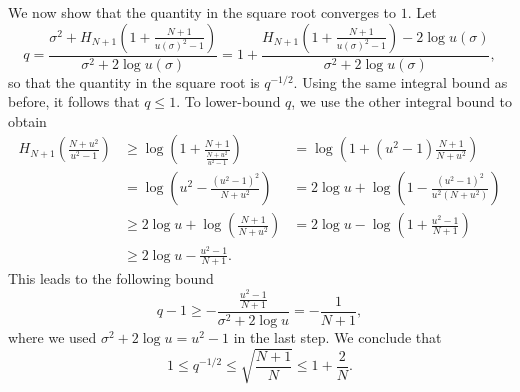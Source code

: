 \documentclass{article}
\begin{document}
\begin{appendixproof}
    We now show that the quantity in the square root converges to $1$. Let
    \[
    q=\frac{\sigma^2+H_{N+1}\left(1+\frac{N+1}{u(\sigma)^2-1}\right)}{\sigma^2+2\log u(\sigma)}=1+\frac{H_{N+1}\left(1+\frac{N+1}{u(\sigma)^2-1}\right)-2\log u(\sigma)}{\sigma^2+2\log u(\sigma)},
    \]
    so that the quantity in the square root is $q^{-1/2}$.
    Using the same integral bound as before, it follows that $q\le 1$. To lower-bound $q$, we use the other integral bound to obtain
    \begin{eqnarray*}
    H_{N+1}\left(\frac{N+u^2}{u^2-1}\right)
    &\ge \log\left(1+\frac{N+1}{\frac{N+u^2}{u^2-1}}\right)
    &=\log\left(1+(u^2-1)\frac{N+1}{N+u^2}\right)\\
    &=\log\left(u^2-\frac{(u^2-1)^2}{N+u^2}\right)
    &=2\log u+\log\left(1-\frac{(u^2-1)^2}{u^2(N+u^2)}\right)\\
    &\ge 2\log u+\log\left(\frac{N+1}{N+u^2}\right)
    &=2\log u-\log\left(1+\frac{u^2-1}{N+1}\right)\\
    &\ge 2\log u-\frac{u^2-1}{N+1}.
    \end{eqnarray*}
    This leads to the following bound
    \[
    q-1\ge -\frac{\frac{u^2-1}{N+1}}{\sigma^2+2\log u}=-\frac{1}{N+1},
    \]
    where we used $\sigma^2+2\log u=u^2-1$ in the last step.
    We conclude that
    \[
    1\le q^{-1/2}\le \sqrt{\frac{N+1}{N}}\le 1+\frac{2}{N}.
    \]
\end{appendixproof}
\end{document}
